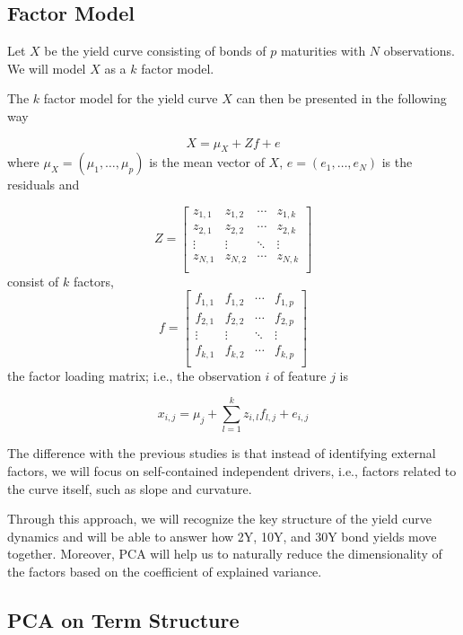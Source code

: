 \begin{enumerate}
\subsection{Factor Model}
Let $X$ be the yield curve consisting of bonds of $p$ maturities with $N$ observations. We will model $X$ as a $k$ factor model.

The $k$ factor model for the yield curve $X$ can then be presented in the following way

$$
X = \mu_ X + Zf + e
$$
where $\mu_X = (\mu_1,\ldots, \mu_p)$ is the mean vector of $X$, $e = (e_1,\ldots, e_N )$ is the residuals and

$$
Z =
\begin{bmatrix}
	z_{1,1} & z_{1,2} & \cdots & z_{1,k} \\
	z_{2,1} & z_{2,2} & \cdots & z_{2,k} \\
	\vdots & \vdots & \ddots & \vdots \\
	z_{N,1} & z_{N,2} & \cdots & z_{N,k} \\
\end{bmatrix}
$$
consist of $k$ factors,
$$
f =
\begin{bmatrix}
	f_{1,1} & f_{1,2} & \cdots & f_{1,p} \\
	f_{2,1} & f_{2,2} & \cdots & f_{2,p} \\
	\vdots & \vdots & \ddots & \vdots \\
	f_{k,1} & f_{k,2} & \cdots & f_{k,p} \\
\end{bmatrix}
$$
the factor loading matrix; i.e., the observation $i$ of feature $j$ is

$$
x_{i,j} = \mu_j + \sum_{l=1}^k z_{i,l}f_{l,j} + e_{i,j}
$$

The difference with the previous studies is that instead of identifying external factors, we will focus on self-contained independent drivers, i.e., factors related to the curve itself, such as slope and curvature.

Through this approach, we will recognize the key structure of the yield curve dynamics and will be able to answer how 2Y, 10Y, and 30Y bond yields move together. Moreover, PCA will help us to naturally reduce the dimensionality of the factors based on the coefficient of explained variance.

\subsection{PCA on Term Structure}


\end{enumerate}
